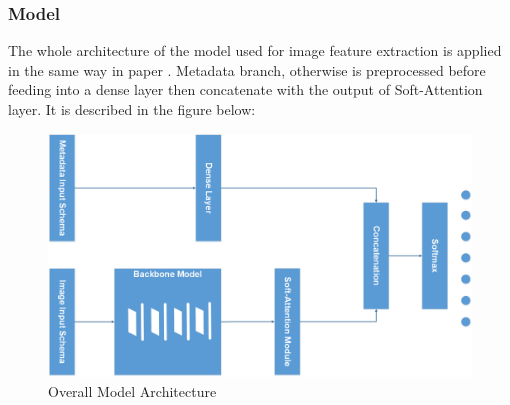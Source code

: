\documentclass[sensors,article,submit,pdftex,moreauthors]{Definitions/mdpi}
\begin{document}
\subsubsection{Model}
The whole architecture of the model used for image feature extraction is applied in the same way in paper \cite{03358}. Metadata branch, otherwise is preprocessed before feeding into a dense layer then concatenate with the output of Soft-Attention layer. It is described in the figure below:
\FloatBarrier
\begin{figure}[h]
	\centering
	\includegraphics[width=0.7\linewidth]{Definitions/MainModel - Model Form}
	\caption{Overall Model Architecture}
	\label{fig:mainmodel}
\end{figure}
\FloatBarrier
\end{document}
